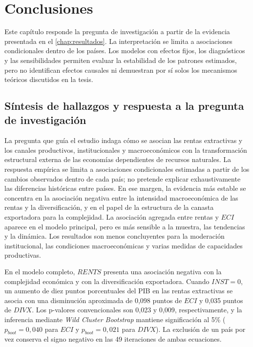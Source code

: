 \documentclass[../../TFM.tex]{subfiles}
\begin{document}

\chapter{Conclusiones}
\label{chap:conclusiones}

Este capítulo responde la pregunta de investigación a partir de la evidencia
presentada en el \autoref{chap:resultados}. La interpretación se limita a
asociaciones condicionales dentro de los países. Los modelos con efectos fijos,
los diagnósticos y las sensibilidades permiten evaluar la estabilidad de los
patrones estimados, pero no identifican efectos causales ni demuestran por sí
solos los mecanismos teóricos discutidos en la tesis.


\section{Síntesis de hallazgos y respuesta a la pregunta de investigación}
\label{sec:sintesis-hallazgos}

La pregunta que guía el estudio indaga cómo se asocian las rentas extractivas y
los canales productivos, institucionales y macroeconómicos con la transformación
estructural externa de las economías dependientes de recursos naturales. La
respuesta empírica se limita a asociaciones condicionales estimadas a partir de
los cambios observados dentro de cada país; no pretende explicar exhaustivamente
las diferencias históricas entre países.
En ese margen, la evidencia más estable se concentra en la asociación negativa
entre la intensidad macroeconómica de las rentas y la diversificación, y en el
papel de la estructura de la canasta exportadora para la complejidad. La
asociación agregada entre rentas y $ECI$ aparece en el modelo principal, pero es
más sensible a la muestra, las tendencias y la dinámica. Los resultados son
menos concluyentes para la moderación institucional, las condiciones
macroeconómicas y varias medidas de capacidades productivas.

En el modelo completo, $RENTS$ presenta una asociación negativa con la
complejidad económica y con la diversificación exportadora. Cuando $INST=0$, un
aumento de diez puntos porcentuales del PIB en las rentas extractivas se asocia
con una disminución aproximada de 0,098 puntos de $ECI$ y 0,035 puntos de
$DIVX$. Los p-valores convencionales son 0,023 y 0,009, respectivamente, y la
inferencia mediante \textit{Wild Cluster Bootstrap} mantiene significación al
5\% ($p_{boot}=0,040$ para $ECI$ y $p_{boot}=0,021$ para $DIVX$). La exclusión
de un país por vez conserva el signo negativo en las 49 iteraciones de ambas
ecuaciones.
\end{document}
